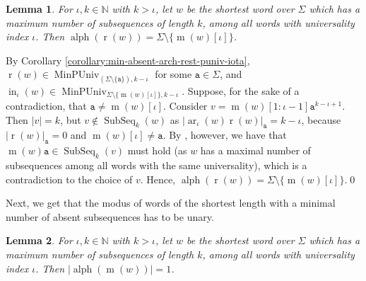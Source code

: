 \documentclass[10pt,a4paper]{amsart}
\makeatletter
\newcommand{\N}{\mathbb{N}}
\def\ta{\mathtt{a}}
\def\r{\operatorname{r}}
\def\m{\operatorname{m}}
\DeclareMathOperator{\arch}{ar}
\DeclareMathOperator{\alphabet}{alph}
\DeclareMathOperator\ScatFact{SubSeq}
\DeclareMathOperator{\MinPerfUniv}{MinPUniv}
\DeclareMathOperator{\inner}{in}
\newif\ifpaper
\theoremstyle{plain}
\newtheorem{lemma}{Lemma}
\theoremstyle{definition}
\renewenvironment{proof}[1][\proofname]{\par
  \pushQED{}%
  \normalfont \topsep6\p@\@plus6\p@\relax
  \trivlist
  \item[\hskip\labelsep\itshape #1\@addpunct{.}]\ignorespaces
}{%
  \popQED\endtrivlist\@endpefalse
}
\makeatother
\begin{document}
\ifpaper
\else
\begin{lemma}\label{lemma:min-absent-rest-no-last-modus}
    For $\iota, k\in\N$ with $k > \iota$, let $w$ be the shortest word over $\Sigma$ which has a maximum number of subsequences of length $k$, among all words with universality index $\iota$.
    Then $\alphabet(\r(w)) = \Sigma \setminus \{\m(w)[\iota]\}$.
\end{lemma}

\begin{proof}
	By Corollary \ref{corollary:min-absent-arch-rest-puniv-iota}, $\r(w)\in\MinPerfUniv_{(\Sigma\setminus\{\ta\}),k-\iota}$
	for some $\ta\in\Sigma$, and $\inner_{\iota}(w)\in\MinPerfUniv_{\Sigma\setminus\{\m(w)[\iota]\},k-\iota}$.
	Suppose, for the sake of a contradiction, that $\ta\neq\m(w)[\iota]$.
	Consider $v = \m(w)[1:\iota-1]\ta^{k-\iota+1}$.
	Then $\vert v\vert  = k$, but $v\notin\ScatFact_k(w)$ as $\vert \arch_{\iota}(w)\r(w)\vert _{\ta} = k-\iota$, because
	$\vert \r(w)\vert _\ta = 0$ and $\m(w)[\iota] \neq \ta$. By  , however, we have that $\m(w)\ta\in\ScatFact_k(v)$ must hold (as $w$ has a maximal number of subsequences among all words with the same universality), which is a contradiction to the choice of $v$.
	Hence, $\alphabet(\r(w)) = \Sigma\setminus\{\m(w)[\iota]\}$.\qed
\end{proof}
\fi

\ifpaper
\else
Next, we get that the modus of words of the shortest length with a minimal number of absent subsequences has to be unary.
\fi


\ifpaper
\else
\begin{lemma}\label{lemma:min-abs-shortest-word-unary-modus}
    For $\iota, k\in\N$ with $k > \iota$, let $w$ be the shortest word over $\Sigma$ which has a maximum number of subsequences of length $k$, among all words with universality index $\iota$.
    Then $\vert \alphabet(\m(w))\vert  = 1$.
\end{lemma}
\end{document}
